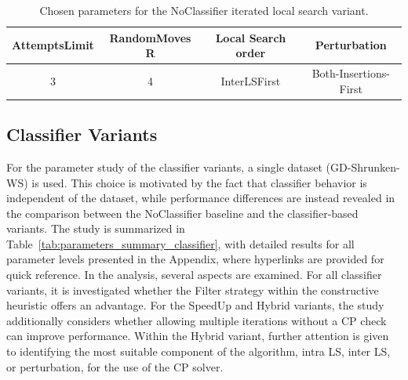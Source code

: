 \begin{table}[ht]
	\centering
	\small
	\begin{tabular}{@{}cccc@{}}
		\toprule
		AttemptsLimit & RandomMoves        R & Local Search order & Perturbation          \\
		\midrule
		3             & 4                    & InterLSFirst       & Both-Insertions-First \\
		\bottomrule
	\end{tabular}
	\caption{Chosen parameters for the NoClassifier iterated local search variant.}
	\label{tab:parameters_final_noclassifier}
\end{table}

\subsection{Classifier Variants}
\label{subsec_parameterStuy_speedup}
For the parameter study of the classifier variants, a single dataset (GD-Shrunken-WS) is used. This choice is motivated
by the fact that classifier behavior is independent of the dataset, while performance differences are instead revealed in
the comparison between the NoClassifier baseline and the classifier-based variants. The study is summarized in
Table~\ref{tab:parameters_summary_classifier}, with detailed results for all parameter levels presented in the Appendix,
where hyperlinks are provided for quick reference.
In the analysis, several aspects are examined. For all classifier variants, it is investigated whether the Filter strategy
within the constructive heuristic offers an advantage. For the SpeedUp and Hybrid variants, the study additionally
considers whether allowing multiple iterations without a \gls{CP} check can improve performance. Within the Hybrid variant,
further attention is given to identifying the most suitable component of the algorithm, intra \gls{LS}, inter \gls{LS}, or
perturbation, for the use of the \gls{CP} solver.
